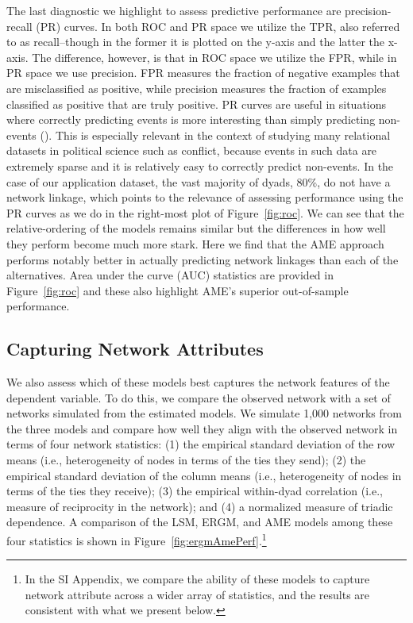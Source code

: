 The last diagnostic we highlight to assess predictive performance are precision-recall (PR) curves. In both ROC and PR space we utilize the TPR, also referred to as recall--though in the former it is plotted on the y-axis and the latter the x-axis. The difference, however, is that in ROC space we utilize the FPR, while in PR space we use precision. FPR measures the fraction of negative examples that are misclassified as positive, while precision measures the fraction of examples classified as positive that are truly positive. PR curves are useful in situations where correctly predicting events is more interesting than simply predicting non-events (\citealt{davis:goadrich:2006}). This is especially relevant in the context of studying many relational datasets in political science such as conflict, because events in such data are extremely sparse and it is relatively easy to correctly predict non-events. In the case of our application dataset, the vast majority of dyads, 80\%, do not have a network linkage, which points to the relevance of assessing performance using the PR curves as we do in the right-most plot of Figure~\ref{fig:roc}. We can see that the relative-ordering of the models remains similar but the differences in how well they perform become much more stark. Here we find that the AME approach performs notably better in actually predicting network linkages than each of the alternatives. Area under the curve (AUC) statistics are provided in Figure~\ref{fig:roc} and these also highlight AME's superior out-of-sample performance.

\FloatBarrier

\subsection*{Capturing Network Attributes}

We also assess which of these models best captures the network features of the dependent variable. To do this, we compare the observed network with a set of networks simulated from the estimated models. We simulate 1,000 networks from the three models and compare how well they align with the observed network in terms of four network statistics: (1) the empirical standard deviation of the row means (i.e., heterogeneity of nodes in terms of the ties they send); (2) the empirical standard deviation of the column means (i.e., heterogeneity of nodes in terms of the ties they receive); (3) the empirical within-dyad correlation (i.e., measure of reciprocity in the network); and (4) a normalized measure of triadic dependence. A comparison of the LSM, ERGM, and AME models among these four statistics is shown in Figure~\ref{fig:ergmAmePerf}.\footnote{In the SI Appendix, we compare the ability of these models to capture network attribute across a wider array of statistics, and the results are consistent with what we present below.}

